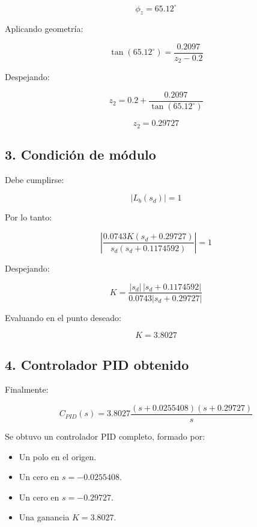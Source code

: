 \documentclass[10pt]{article}
\begin{document}
\begin{equation}
\boxed{\phi_z=65.12^\circ}
\end{equation}

Aplicando geometría:

\[
\tan(65.12^\circ)
=
\frac{0.2097}{z_2-0.2}
\]

Despejando:

\[
z_2=
0.2+\frac{0.2097}{\tan(65.12^\circ)}
\]

\begin{equation}
\boxed{z_2=0.29727}
\end{equation}

\subsection*{3. Condición de módulo}

Debe cumplirse:

\begin{equation}
|L_b(s_d)|=1
\end{equation}

Por lo tanto:

\[
\left|
\frac{
0.0743K(s_d+0.29727)
}{
s_d(s_d+0.1174592)
}
\right|=1
\]

Despejando:

\[
K=
\frac{
|s_d|\,|s_d+0.1174592|
}{
0.0743|s_d+0.29727|
}
\]

Evaluando en el punto deseado:

\begin{equation}
\boxed{K=3.8027}
\end{equation}

\subsection*{4. Controlador PID obtenido}

Finalmente:

\begin{equation}
\boxed{
C_{PID}(s)=
3.8027
\frac{
(s+0.0255408)(s+0.29727)
}{s}
}
\end{equation}

Se obtuvo un controlador PID completo,
formado por:

\begin{itemize}
    \item Un polo en el origen.
    \item Un cero en $s=-0.0255408$.
    \item Un cero en $s=-0.29727$.
    \item Una ganancia $K=3.8027$.
\end{itemize}
\end{document}
